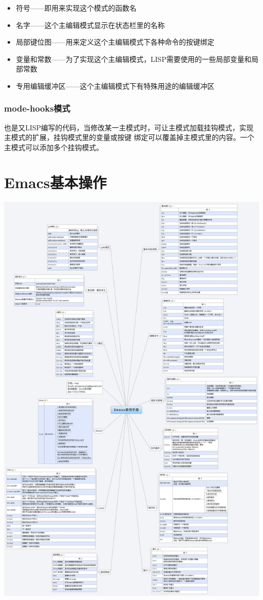 \documentclass[11pt]{article}
\begin{document}
\begin{itemize}
\item 符号——即用来实现这个模式的函数名
\item 名字——这个主编辑模式显示在状态栏里的名称
\item 局部键位图——用来定义这个主编辑模式下各种命令的按键绑定
\item 变量和常数——为了实现这个主编辑模式，LISP需要使用的一些局部变量和局部常数
\item 专用编辑缓冲区——这个主编辑模式下有特殊用途的编辑缓冲区
\end{itemize}
\subsubsection{mode-hooks模式}
\label{sec-3-1-2}

    也是又LISP编写的代码，当修改某一主模式时，可让主模式加载挂钩模式，实现主模式的扩展，挂钩模式里的变量或按键
    绑定可以覆盖掉主模式里的内容。一个主模式可以添加多个挂钩模式。
\section{Emacs基本操作}
\label{sec-4}

  \includegraphics[width=.9\linewidth]{./images/Emacs-base.jpg}
\end{document}
